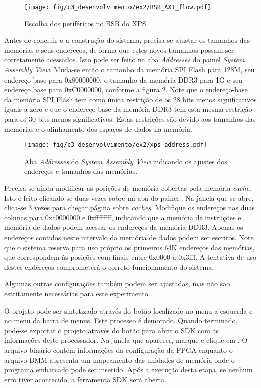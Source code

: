 \documentclass[11pt,a4paper,oneside]{book}
\begin{document}
\begin{figure}[htp]
\centering
\texttt{[image: fig/c3\_desenvolvimento/ex2/BSB\_AXI\_flow.pdf]}
\caption{Escolha dos periféricos no BSB do XPS.}
\label{fig:ex2:bsb_prerifericos}
\end{figure}

Antes de concluir o a construção do sistema, precisa-se ajustar os tamanhos das memórias e seus endereços, de forma que estes novos tamanhos possam ser corretamente acessados.
Isto pode ser feito na aba \textit{Addresses} do painel \textit{System Assembly View}.
Muda-se então o tamanho da memória SPI Flash para 128M, seu endereço base para 0x80000000, o tamanho da memória DDR3 para 1G e seu endereço base para 0xC0000000, conforme a figura \ref{fig:ex2:xps_enderecos}.
Note que o endereço-base da memória SPI Flash tem como única restrição de os 28 bits menos significativos iguais a zero e que o endereço-base da memória DDR3 tem esta mesma restrição para os 30 bits menos significativos.
Estas restrições são devido aos tamanhos das memórias e o alinhamento dos espaços de dados na memória.

\begin{figure}[htp]
\centering
\texttt{[image: fig/c3\_desenvolvimento/ex2/xps\_address.pdf]}
\caption{Aba \textit{Addresses} do \textit{System Assembly View} indicando os ajustes dos endereços e tamanhos das memórias.}
\label{fig:ex2:xps_enderecos}
\end{figure}

Precisa-se ainda modificar as posições de memória cobertas pela memória \textit{cache}.
Isto é feito clicando-se duas vezes sobre  na aba  do painel .
Na janela que se abre, clica-se   3 vezes para chegar página sobre \textit{caches}.
Modifique os endereços nas duas colunas para 0xc0000000 e 0xffffffff, indicando que a memória de instruções e memória de dados podem acessar os endereços da memória DDR3.
Apenas os endereços contidos neste intervalo da memória de dados podem ser escritos.
Note que o sistema reserva para uso próprio os primeiros 64K endereços das memórias, que correspondem às posições com finais entre 0x0000 a 0x3fff.
A tentativa de uso destes endereços comprometerá o correto funcionamento do sistema.

Algumas outras configurações também podem ser ajustadas, mas não sao estritamente necessárias para este experimento.

O projeto pode ser sintetizado através do botão  localizado no menu a esquerda e no menu  da barra de menus.
Este processo é demorado.
Quando terminado, pode-se exportar o projeto através do botão  para abrir o SDK com as informações deste processador.
Na janela que aparecer, marque  e clique em .
O arquivo binário contém informações da configuração da FPGA enquanto o arquivo BMM apresenta um mapeamento das unidades de memória onde o programa embarcado pode ser inserido.
Após a execução desta etapa, se nenhum erro tiver acontecido, a ferramenta SDK será aberta.
\end{document}
